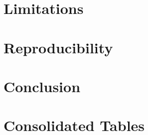 \documentclass[11pt]{article}
\begin{document}
\section{Limitations}


\section{Reproducibility}


\section{Conclusion}


\appendix
\section{Consolidated Tables}




\end{document}
